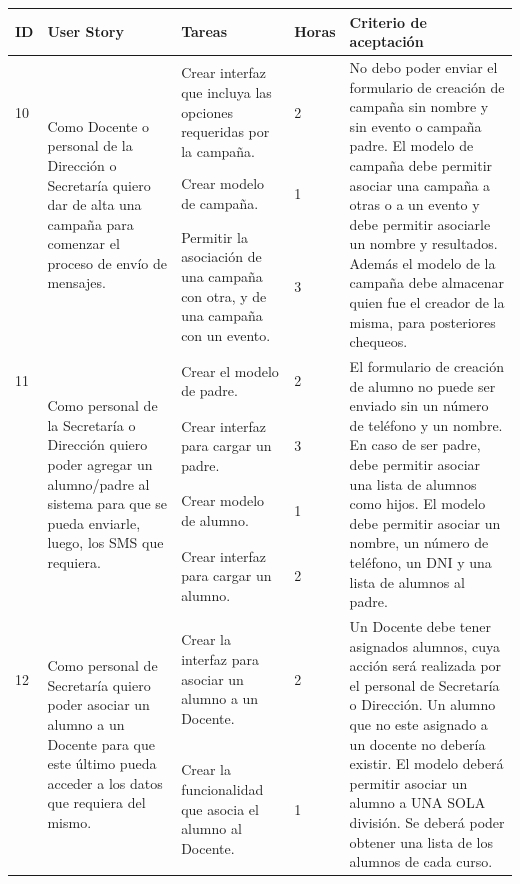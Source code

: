 \documentclass[a4paper, 11pt]{article}
\begin{document}
\begin{table}[H]
\centering
\begin{tabular}{ | p{0.5cm} | p{4cm} | p{5cm} | p{0.85cm} | p{5cm} |}
\hline 
ID & User Story & Tareas & Horas & Criterio de aceptación \\ \hline \hline

10 & \multirow{3}{4cm}{Como Docente o personal de la Dirección o Secretaría quiero dar de alta una campaña para comenzar el proceso de envío de mensajes.} &  Crear interfaz que incluya las opciones requeridas por la campaña. & 2 & \multirow{3}{5cm}{No debo poder enviar el formulario de creación de campaña sin nombre y sin evento o campaña padre. El modelo de campaña debe permitir asociar una campaña a otras o a un evento y debe permitir asociarle un nombre y resultados. Además el modelo de la campaña debe almacenar quien fue el creador de la misma, para posteriores chequeos.}\\[2cm] \cline{3-4}
& & Crear modelo de campaña. & 1 & \\[2cm] \cline{3-4}
& & Permitir la asociación de una campaña con otra, y de una campaña con un evento. & 3 & \\[2cm] \hline


11 & \multirow{4}{4cm}{Como personal de la Secretaría o Dirección quiero poder agregar un alumno/padre al sistema para que se pueda enviarle, luego, los SMS que requiera.} & Crear el modelo de padre. & 2 &
\multirow{4}{5cm}{El formulario de creación de alumno no puede ser enviado sin un número de teléfono y un nombre. En caso de ser padre, debe permitir asociar una lista de alumnos como hijos.
El modelo debe permitir asociar  un nombre, un número de teléfono, un DNI y una lista de alumnos al padre.} \\ \cline{3-4}
& & Crear interfaz para cargar un padre. & 3 & \\\cline{3-4}
& & Crear modelo de alumno. & 1 & \\[1cm] \cline{3-4}
& & Crear interfaz para cargar un alumno. & 2 & \\[2cm] \hline


12 & \multirow{2}{4cm}{Como personal de Secretaría quiero poder asociar un alumno a un Docente para que este último pueda acceder a los datos que requiera del mismo.} & Crear la interfaz para asociar un alumno a un Docente. & 2 & \multirow{2}{5cm}{Un Docente debe tener asignados alumnos, cuya acción será realizada por el personal de Secretaría o Dirección. Un alumno que no este asignado a un docente no debería existir. El modelo deberá permitir asociar un alumno a UNA SOLA división. Se deberá poder obtener una lista de los alumnos de cada curso.} \\[2.5cm] \cline{3-4}
& & Crear la funcionalidad que asocia el alumno al Docente. & 1 & \\[2.5cm] \hline


\end{tabular}
\end{table}
\end{document}
